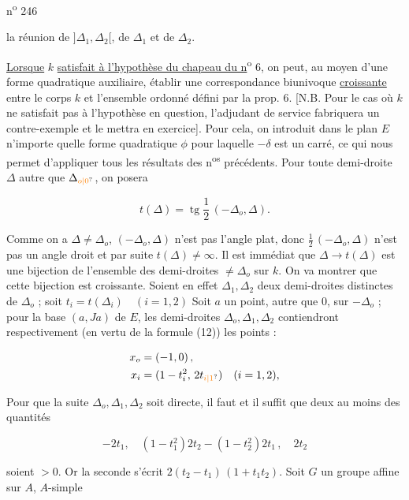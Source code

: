 n\textsuperscript{o} 246

la réunion de $]\Delta_1,\Delta_2[$, de $\Delta_1$ et de $\Delta_2$.

\uline{Lorsque} $k$ \uline{satisfait à l'hypothèse du chapeau du n}\textsuperscript{o} 6, on peut, au moyen d'une forme quadratique auxiliaire, établir une correspondance biunivoque \uline{croissante} entre le corps $k$ et l'ensemble ordonné défini par la prop. 6. [N.B. Pour le cas où $k$ ne satisfait pas à l'hypothèse en question, l'adjudant de service fabriquera un contre-exemple et le mettra en exercice]. Pour cela, on introduit dans le plan $E$ n'importe quelle forme quadratique $\phi$ pour laquelle $-\delta$ est un carré, ce qui nous permet d'appliquer tous les résultats des n\textsuperscript{os} précédents. Pour toute demi-droite $\Delta$ autre que $\Delta_{\unsure{o|0}}$, on posera

\[
t(\Delta)=\operatorname{tg}\frac{1}{2}\,(-\Delta_o,\Delta).
\]

Comme on a $\Delta\ne\Delta_o$, $(-\Delta_o,\Delta)$ n'est pas l'angle plat, donc $\frac{1}{2}\,(-\Delta_o,\Delta)$ n'est pas un angle droit et par suite $t(\Delta)\ne\infty$. Il est immédiat que $\Delta\longrightarrow t(\Delta)$ est une bijection de l'ensemble des demi-droites $\ne\Delta_o$ sur $k$. On va montrer que cette bijection est croissante. Soient en effet $\Delta_1,\Delta_2$ deux demi-droites distinctes de $\Delta_o$ ; soit $t_i=t(\Delta_i)\quad(i=1,2)$ Soit $a$ un point, autre que $0$, sur $-\Delta_o$ ; pour la base $(a,Ja)$ de $E$, les demi-droites $\Delta_o,\Delta_1,\Delta_2$ contiendront respectivement (en vertu de la formule (12)) les points :

\[
\begin{aligned}
x_o&=(-1,0)\,,\\
x_i&=(1-t_i^2,\,2t_{\unsure{i|1}})\quad(i=1,2),
\end{aligned}
\]

Pour que la suite $\Delta_o,\Delta_1,\Delta_2$ soit directe, il faut et il suffit que deux au moins des quantités

\[
-2t_1,\quad(1-t_1^2)2t_2-(1-t_2^2)2t_1\,,\quad 2t_2
\]

soient $>0$. Or la seconde s'écrit $2(t_2-t_1)\,(1+t_1t_2)$.
Soit $G$ un  groupe affine sur $A$, $A$-simple

